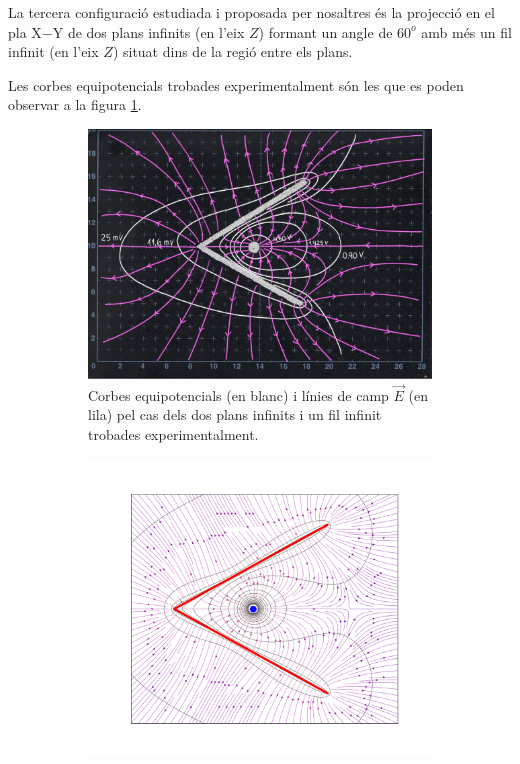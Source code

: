 \documentclass[a4paper,10.5pt]{report}
\begin{document}
La tercera configuració estudiada i proposada per nosaltres és la projecció en el pla X$-$Y de dos plans infinits (en l'eix $Z$) formant un angle de $60^o$ amb més un fil infinit (en l'eix $Z$) situat dins de la regió entre els plans.

Les corbes equipotencials trobades experimentalment són les que es poden observar a la figura \ref{fig:1.4a}.

\begin{figure}[h]
	\centering
	\begin{subfigure}{0.49\linewidth}
		\centering
		\includegraphics[angle=90, width=\linewidth]{confinventJS}
		\caption{Corbes equipotencials (en blanc) i línies de camp $\vec{E}$ (en lila) pel cas dels dos plans infinits i un fil infinit trobades experimentalment.}
		\label{fig:1.4a}
	\end{subfigure}
	\hfill
	\begin{subfigure}{0.49\linewidth}
		\centering
		\includegraphics[width=\linewidth]{figplacarara}

\end{subfigure}
\end{figure}
\end{document}
